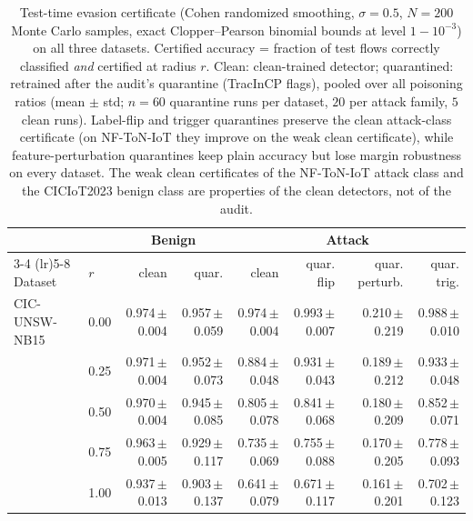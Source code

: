 \begin{table}[tbp]
\centering
\footnotesize
\setlength{\tabcolsep}{4pt}
\caption{Test-time evasion certificate (Cohen randomized smoothing, $\sigma=0.5$, $N=200$ Monte Carlo samples, exact Clopper--Pearson binomial bounds at level $1-10^{-3}$) on all three datasets. Certified accuracy = fraction of test flows correctly classified \emph{and} certified at radius $r$. Clean: clean-trained detector; quarantined: retrained after the audit's quarantine (TracInCP flags), pooled over all poisoning ratios (mean $\pm$ std; $n=60$ quarantine runs per dataset, $20$ per attack family, $5$ clean runs). Label-flip and trigger quarantines preserve the clean attack-class certificate (on NF-ToN-IoT they improve on the weak clean certificate), while feature-perturbation quarantines keep plain accuracy but lose margin robustness on every dataset. The weak clean certificates of the NF-ToN-IoT attack class and the CICIoT2023 benign class are properties of the clean detectors, not of the audit.}
\label{tab:rs_radii}
\begin{tabular}{ll rr rrrr}
\toprule
& & \multicolumn{2}{c}{Benign} & \multicolumn{4}{c}{Attack} \\
\cmidrule(lr){3-4} \cmidrule(lr){5-8}
Dataset & $r$ & clean & quar. & clean & quar. flip & quar. perturb. & quar. trig. \\
\midrule
CIC-UNSW-NB15 & 0.00 & 0.974\,{\footnotesize$\pm$0.004} & 0.957\,{\footnotesize$\pm$0.059} & 0.974\,{\footnotesize$\pm$0.004} & 0.993\,{\footnotesize$\pm$0.007} & 0.210\,{\footnotesize$\pm$0.219} & 0.988\,{\footnotesize$\pm$0.010} \\
 & 0.25 & 0.971\,{\footnotesize$\pm$0.004} & 0.952\,{\footnotesize$\pm$0.073} & 0.884\,{\footnotesize$\pm$0.048} & 0.931\,{\footnotesize$\pm$0.043} & 0.189\,{\footnotesize$\pm$0.212} & 0.933\,{\footnotesize$\pm$0.048} \\
 & 0.50 & 0.970\,{\footnotesize$\pm$0.004} & 0.945\,{\footnotesize$\pm$0.085} & 0.805\,{\footnotesize$\pm$0.078} & 0.841\,{\footnotesize$\pm$0.068} & 0.180\,{\footnotesize$\pm$0.209} & 0.852\,{\footnotesize$\pm$0.071} \\
 & 0.75 & 0.963\,{\footnotesize$\pm$0.005} & 0.929\,{\footnotesize$\pm$0.117} & 0.735\,{\footnotesize$\pm$0.069} & 0.755\,{\footnotesize$\pm$0.088} & 0.170\,{\footnotesize$\pm$0.205} & 0.778\,{\footnotesize$\pm$0.093} \\
 & 1.00 & 0.937\,{\footnotesize$\pm$0.013} & 0.903\,{\footnotesize$\pm$0.137} & 0.641\,{\footnotesize$\pm$0.079} & 0.671\,{\footnotesize$\pm$0.117} & 0.161\,{\footnotesize$\pm$0.201} & 0.702\,{\footnotesize$\pm$0.123} \\

\end{tabular}
\end{table}
